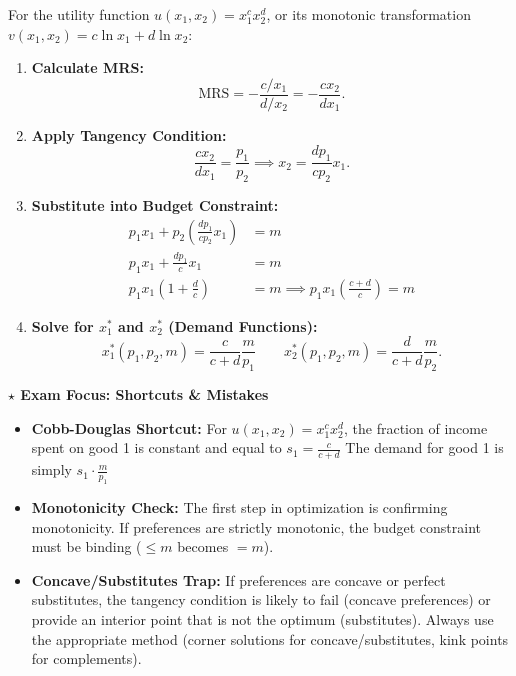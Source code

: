 \documentclass{article}
\begin{document}
\noindent For the utility function $u(x_1, x_2) = x_1^c x_2^d$, or its monotonic transformation $v(x_1, x_2) = c \ln x_1 + d \ln x_2$:
\begin{enumerate}
    \item \textbf{Calculate MRS:} \[ \text{MRS} = -\frac{c/x_1}{d/x_2} = -\frac{c x_2}{d x_1}. \]
    \item \textbf{Apply Tangency Condition:} \[ \frac{c x_2}{d x_1} = \frac{p_1}{p_2} \implies x_2 = \frac{d p_1}{c p_2} x_1. \]
    \item \textbf{Substitute into Budget Constraint:} 
    \begin{align*} 
    p_1 x_1 + p_2 \left(\frac{d p_1}{c p_2} x_1\right) &= m \\ 
    p_1 x_1 + \frac{d p_1}{c} x_1 &= m \\ 
    p_1 x_1 \left(1 + \frac{d}{c}\right) &= m \implies p_1 x_1 \left(\frac{c+d}{c}\right) = m 
    \end{align*}
    \item \textbf{Solve for $x_1^*$ and $x_2^*$ (Demand Functions):} \[ x_1^*(p_1, p_2, m) = \frac{c}{c+d} \frac{m}{p_1} \qquad x_2^*(p_1, p_2, m) = \frac{d}{c+d} \frac{m}{p_2}. \]
\end{enumerate}

\vspace{0.5em}

\vspace{0.5em}

\noindent\textbf{$\star$ Exam Focus: Shortcuts \& Mistakes}
\begin{itemize}
    \item \textbf{Cobb-Douglas Shortcut:} For $u(x_1, x_2) = x_1^c x_2^d$, the fraction of income spent on good 1 is constant and equal to $s_1 = \frac{c}{c+d}$ The demand for good 1 is simply $s_1 \cdot \frac{m}{p_1}$
    \item \textbf{Monotonicity Check:} The first step in optimization is confirming monotonicity. If preferences are strictly monotonic, the budget constraint must be binding ($\leq m$ becomes $= m$).
    \item \textbf{Concave/Substitutes Trap:} If preferences are concave or perfect substitutes, the tangency condition is likely to fail (concave preferences) or provide an interior point that is not the optimum (substitutes). Always use the appropriate method (corner solutions for concave/substitutes, kink points for complements).
\end{itemize}

\vspace{0.5em}
\end{document}
